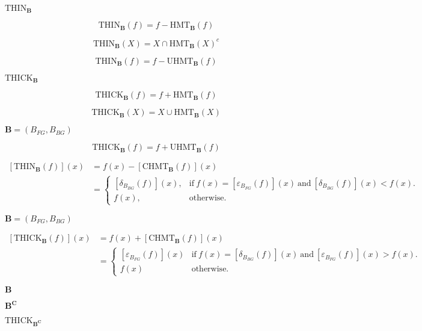 \documentclass{article}
\begin{document}
{$ \mathrm{THIN}_{\mathbf{B}} $
\pagebreak

\[ \mathrm{THIN}_{\mathbf{B}}(f) = f - \mathrm{HMT}_{\mathbf{B}}(f) \]
\pagebreak

\[ \mathrm{THIN}_{\mathbf{B}}(X) = X \cap {\mathrm{HMT}_{\mathbf{B}}}(X)^c \]
\pagebreak

\[ \mathrm{THIN}_{\mathbf{B}}(f) = f - \mathrm{UHMT}_{\mathbf{B}}(f) \]
\pagebreak

$ \mathrm{THICK}_{\mathbf{B}} $
\pagebreak

\[ \mathrm{THICK}_{\mathbf{B}}(f) = f + \mathrm{HMT}_{\mathbf{B}}(f) \]
\pagebreak

\[ \mathrm{THICK}_{\mathbf{B}}(X) = X \cup \mathrm{HMT}_{\mathbf{B}}(X) \]
\pagebreak

$ \mathbf{B} = \left( B_{FG}, B_{BG} \right) $
\pagebreak

\[ \mathrm{THICK}_{\mathbf{B}}(f) = f + \mathrm{UHMT}_{\mathbf{B}}(f) \]
\pagebreak

\[ \begin{aligned} \left[\mathrm{THIN}_{\mathbf{B}}(f)\right](x) & = f(x) - \left[\mathrm{CHMT}_{\mathbf{B}}(f)\right](x) \\ & = \begin{cases} \left[\delta _{B_{BG}}(f)\right](x), & \mathrm{if} \ f(x) = \left[\varepsilon_{B_{FG}}(f)\right](x) \ \mathrm{and} \ \left[\delta_{B_{BG}}(f)\right](x) < f(x). \\ f(x), & \mathrm{otherwise}. \end{cases} \end{aligned} \]
\pagebreak

$ \mathbf{B} = \left( B_{FG}, B_{BG}\right) $
\pagebreak

\[ \begin{aligned} \left[\mathrm{THICK}_{\mathbf{B}}(f)\right](x) & = f(x) + \left[\mathrm{CHMT}_{\mathbf{B}}(f)\right](x) \\ & = \begin{cases} \left[\varepsilon _{B_{FG}}(f)\right](x) & \mathrm{if} \ f(x) = \left[\delta_{B_{BG}}(f)\right](x) \ \mathrm{and} \ \left[\varepsilon_{B_{FG}}(f)\right](x) > f(x). \\ f(x) & \mathrm{otherwise}. \end{cases} \end{aligned} \]
\pagebreak

$\mathbf{B}$
\pagebreak

$\mathbf{B^C}$
\pagebreak

$ \mathrm{THICK}_{\mathbf{B^C}} $
\pagebreak

}
\end{document}
